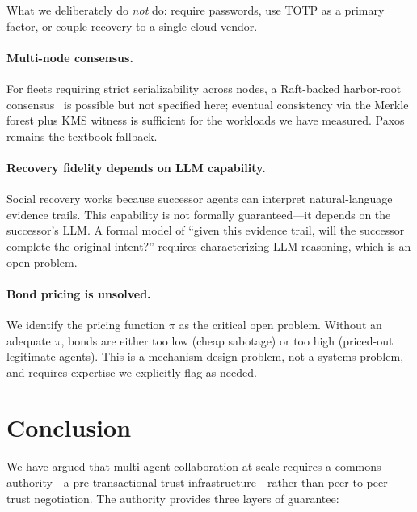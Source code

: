 \documentclass[11pt,a4paper]{article}
\theoremstyle{definition}
\theoremstyle{remark}
\begin{document}
What we deliberately do \emph{not} do: require passwords, use TOTP as a primary factor, or couple recovery to a single cloud vendor.

\paragraph{Multi-node consensus.} For fleets requiring strict serializability across nodes, a Raft-backed harbor-root consensus~\cite{ongaro2014search} is possible but not specified here; eventual consistency via the Merkle forest plus KMS witness is sufficient for the workloads we have measured. Paxos~\cite{lamport1998part} remains the textbook fallback.

\paragraph{Recovery fidelity depends on LLM capability.} Social recovery works because successor agents can interpret natural-language evidence trails. This capability is not formally guaranteed---it depends on the successor's LLM. A formal model of ``given this evidence trail, will the successor complete the original intent?'' requires characterizing LLM reasoning, which is an open problem.

\paragraph{Bond pricing is unsolved.} We identify the pricing function $\pi$ as the critical open problem. Without an adequate $\pi$, bonds are either too low (cheap sabotage) or too high (priced-out legitimate agents). This is a mechanism design problem, not a systems problem, and requires expertise we explicitly flag as needed.

\section{Conclusion}

We have argued that multi-agent collaboration at scale requires a commons authority---a pre-transactional trust infrastructure---rather than peer-to-peer trust negotiation. The authority provides three layers of guarantee:
\end{document}
